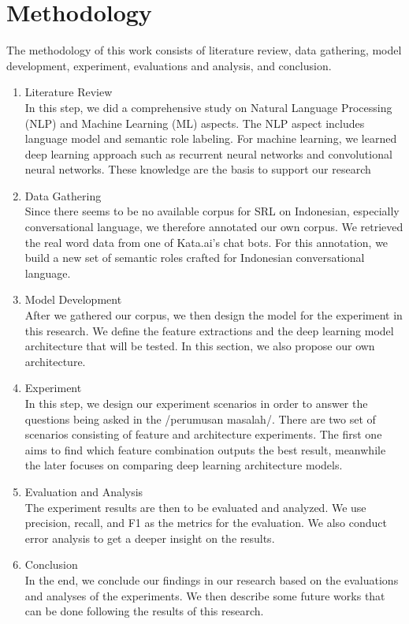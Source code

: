 \section{Methodology}
The methodology of this work consists of literature review, data gathering, model development, experiment, evaluations and analysis, and conclusion.

\begin{enumerate}
	\item Literature Review\\
	In this step, we did a comprehensive study on Natural Language Processing (NLP) and Machine Learning (ML) aspects. The NLP aspect includes language model and semantic role labeling. For machine learning, we learned deep learning approach such as recurrent neural networks and convolutional neural networks. These knowledge are the basis to support our research
	
	\item Data Gathering\\
	Since there seems to be no available corpus for SRL on Indonesian, especially conversational language, we therefore annotated our own corpus. We retrieved the real word data from one of Kata.ai's chat bots. For this annotation, we build a new set of semantic roles crafted for Indonesian conversational language.
	
	\item Model Development\\
	After we gathered our corpus, we then design the model for the experiment in this research. We define the feature extractions and the deep learning model architecture that will be tested. In this section, we also propose our own architecture.
		
	\item Experiment \\
	In this step, we design our experiment scenarios in order to answer the questions being asked in the /perumusan masalah/. There are two set of scenarios consisting of feature and architecture experiments. The first one aims to find which feature combination outputs the best result, meanwhile the later focuses on comparing deep learning architecture models.
	
	\item Evaluation and Analysis \\
	The experiment results are then to be evaluated and analyzed. We use precision, recall, and F1 as the metrics for the evaluation. We also conduct error analysis to get a deeper insight on the results.
	
	\item Conclusion \\
	In the end, we conclude our findings in our research based on the evaluations and analyses of the experiments. We then describe some future works that can be done following the results of this research.
\end{enumerate}

